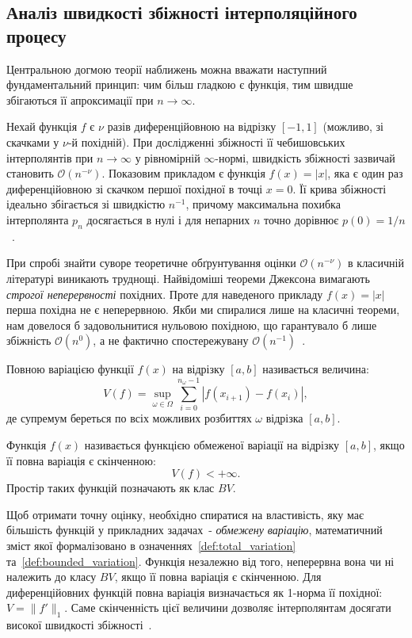 \subsection{Аналіз швидкості збіжності інтерполяційного процесу}


Центральною догмою теорії наближень можна вважати наступний фундаментальний принцип: чим більш гладкою є функція, тим швидше збігаються її апроксимації при $n \to \infty$. 

Нехай функція $f$ є $\nu$ разів диференційовною на відрізку $[-1, 1]$ (можливо, зі скачками у $\nu$-й похідній). При дослідженні збіжності її чебишовських інтерполянтів при $n \to \infty$ у рівномірній $\infty$-нормі, швидкість збіжності зазвичай становить $\mathcal{O}(n^{-\nu})$. Показовим прикладом є функція $f(x) = |x|$, яка є один раз диференційовною зі скачком першої похідної в точці $x = 0$. Її крива збіжності ідеально збігається зі швидкістю $n^{-1}$, причому максимальна похибка інтерполянта $p_n$ досягається в нулі і для непарних $n$ точно дорівнює $p(0) = 1/n$ ~\cite{trefethen2013approximation}.

При спробі знайти суворе теоретичне обґрунтування оцінки $\mathcal{O}(n^{-\nu})$ в класичній літературі виникають труднощі. Найвідоміші теореми Джексона вимагають \textit{строгої неперервності} похідних. Проте для наведеного прикладу $f(x) = |x|$ перша похідна не є неперервною. Якби ми спиралися лише на класичні теореми, нам довелося б задовольнитися нульовою похідною, що гарантувало б лише збіжність $\mathcal{O}(n^0)$, а не фактично спостережувану $\mathcal{O}(n^{-1})$~\cite{trefethen2013approximation}.

\begin{definition}
	\label{def:total_variation}
	Повною варіацією функції $f(x)$ на відрізку $[a,b]$ називається величина:
	\[
	V(f) = \sup_{\omega \in \Omega} \sum_{i = 0}^{n_\omega - 1} |f(x_{i + 1}) - f(x_i)|,
	\]
	де супремум береться по всіх можливих розбиттях $\omega$ відрізка $[a,b]$.
\end{definition}

\begin{definition}
	\label{def:bounded_variation}
	Функція $f(x)$ називається функцією обмеженої варіації на відрізку $[a,b]$, якщо її повна варіація є скінченною:
	\[
	V(f) < +\infty.
	\]
	Простір таких функцій позначають як клас $BV$.
\end{definition}

Щоб отримати точну оцінку, необхідно спиратися на властивість, яку має більшість функцій у прикладних задачах~- \textit{обмежену варіацію}, математичний зміст якої формалізовано в означеннях~\ref{def:total_variation} та~\ref{def:bounded_variation}. Функція незалежно від того, неперервна вона чи ні належить до класу $BV$, якщо її повна варіація є скінченною. Для диференційовних функцій повна варіація визначається як 1-норма її похідної: $V = \|f'\|_1$. Саме скінченність цієї величини дозволяє інтерполянтам досягати високої швидкості збіжності~\cite{trefethen2013approximation}.

